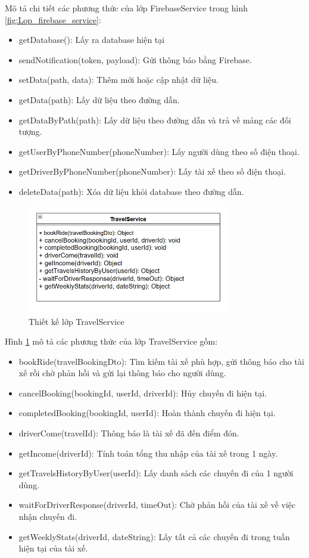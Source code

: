 \documentclass[../DoAn.tex]{subfiles}
\begin{document}
Mô tả chi tiết các phương thức của lớp FirebaseService trong hình \ref{fig:Lop_firebase_service}:
\begin{itemize}
    \item getDatabase(): Lấy ra database hiện tại
    \item sendNotification(token, payload): Gửi thông báo bằng Firebase.
    \item setData(path, data): Thêm mới hoặc cập nhật dữ liệu.
    \item getData(path): Lấy dữ liệu theo đường dẫn.
    \item getDataByPath(path): Lấy dữ liệu theo đường dẫn và trả về mảng các đối tượng.
    \item getUserByPhoneNumber(phoneNumber): Lấy người dùng theo số điện thoại.
    \item getDriverByPhoneNumber(phoneNumber): Lấy tài xế theo số điện thoại.
    \item deleteData(path): Xóa dữ liệu khỏi database theo đường dẫn.
\end{itemize}

\begin{figure}[H]
    \centering
    \includegraphics[width=0.8\textwidth]{Hinhve/Lop_travel_service.png}
    \caption{Thiết kế lớp TravelService}
    \label{fig:Lop_travel_service}
\end{figure}
Hình \ref{fig:Lop_travel_service} mô tả các phương thức của lớp TravelService gồm: 
\begin{itemize}
    \item bookRide(travelBookingDto): Tìm kiếm tài xế phù hợp, gửi thông báo cho tài xế rồi chờ phản hồi và gửi lại thông báo cho người dùng.
    \item cancelBooking(bookingId, userId, driverId): Hủy chuyến đi hiện tại.
    \item completedBooking(bookingId, userId): Hoàn thành chuyến đi hiện tại.
    \item driverCome(travelId): Thông báo là tài xế đã đến điểm đón.
    \item getIncome(driverId): Tính toán tổng thu nhập của tài xế trong 1 ngày.
    \item getTravelsHistoryByUser(userId): Lấy danh sách các chuyến đi của 1 người dùng.
    \item waitForDriverResponse(driverId, timeOut): Chờ phản hồi của tài xế về việc nhận chuyến đi.
    \item getWeeklyStats(driverId, dateString): Lấy tất cả các chuyến đi trong tuần hiện tại của tài xế.
\end{itemize}
\end{document}
